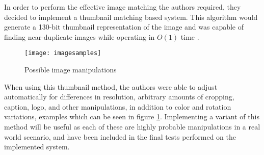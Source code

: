 In order to perform the effective image matching the authors required, they decided to implement a thumbnail matching based system. This algorithm would generate a 130-bit thumbnail representation of the image and was capable of finding near-duplicate images while operating in $O(1)$ time \cite{Srinivasan:2008}.

\begin{figure}[htbp]
\centering
\texttt{[image: imagesamples]}
\caption{Possible image manipulations}
\label{imgsample}
\end{figure}

When using this thumbnail method, the authors were able to adjust automatically for differences in resolution, arbitrary amounts of cropping, caption, logo, and other manipulations, in addition to color and rotation variations, examples which can be seen in figure \ref{imgsample}. Implementing a variant of this method will be useful as each of these are highly probable manipulations in a real world scenario, and have been included in the final tests performed on the implemented system.


